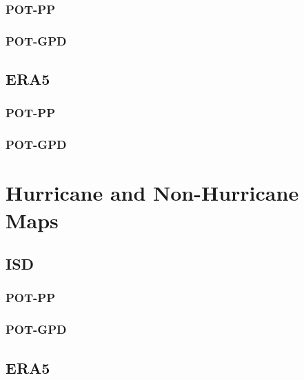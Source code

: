 \documentclass[12pt,oneside]{reedthesis}
\begin{document}
\hypertarget{pot-pp-1}{%
\subsubsection{POT-PP}\label{pot-pp-1}}

\hypertarget{pot-gpd-1}{%
\subsubsection{POT-GPD}\label{pot-gpd-1}}

\hypertarget{era5-1}{%
\subsection{ERA5}\label{era5-1}}

\hypertarget{pot-pp-2}{%
\subsubsection{POT-PP}\label{pot-pp-2}}

\hypertarget{pot-gpd-2}{%
\subsubsection{POT-GPD}\label{pot-gpd-2}}

\hypertarget{hurricane-and-non-hurricane-maps}{%
\section{Hurricane and Non-Hurricane Maps}\label{hurricane-and-non-hurricane-maps}}

\hypertarget{isd-2}{%
\subsection{ISD}\label{isd-2}}

\hypertarget{pot-pp-3}{%
\subsubsection{POT-PP}\label{pot-pp-3}}

\hypertarget{pot-gpd-3}{%
\subsubsection{POT-GPD}\label{pot-gpd-3}}

\hypertarget{era5-2}{%
\subsection{ERA5}\label{era5-2}}
\end{document}
